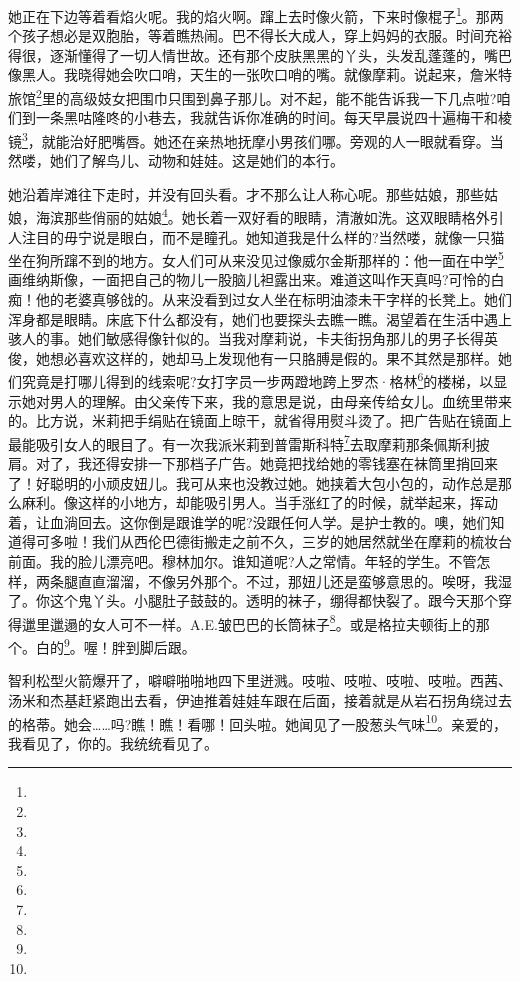 \par 她正在下边等着看焰火呢。我的焰火啊。蹿上去时像火箭，下来时像棍子\footnote{}。那两个孩子想必是双胞胎，等着瞧热闹。巴不得长大成人，穿上妈妈的衣服。时间充裕得很，逐渐懂得了一切人情世故。还有那个皮肤黑黑的丫头，头发乱蓬蓬的，嘴巴像黑人。我晓得她会吹口哨，天生的一张吹口哨的嘴。就像摩莉。说起来，詹米特旅馆\footnote{}里的高级妓女把围巾只围到鼻子那儿。对不起，能不能告诉我一下几点啦?咱们到一条黑咕隆咚的小巷去，我就告诉你准确的时间。每天早晨说四十遍梅干和棱镜\footnote{}，就能治好肥嘴唇。她还在亲热地抚摩小男孩们哪。旁观的人一眼就看穿。当然喽，她们了解鸟儿、动物和娃娃。这是她们的本行。
\par 她沿着岸滩往下走时，并没有回头看。才不那么让人称心呢。那些姑娘，那些姑娘，海滨那些俏丽的姑娘\footnote{}。她长着一双好看的眼睛，清澈如洗。这双眼睛格外引人注目的毋宁说是眼白，而不是瞳孔。她知道我是什么样的?当然喽，就像一只猫坐在狗所蹿不到的地方。女人们可从来没见过像威尔金斯那样的：他一面在中学\footnote{}画维纳斯像，一面把自己的物儿一股脑儿袒露出来。难道这叫作天真吗?可怜的白痴！他的老婆真够戗的。从来没看到过女人坐在标明油漆未干字样的长凳上。她们浑身都是眼睛。床底下什么都没有，她们也要探头去瞧一瞧。渴望着在生活中遇上骇人的事。她们敏感得像针似的。当我对摩莉说，卡夫街拐角那儿的男子长得英俊，她想必喜欢这样的，她却马上发现他有一只胳膊是假的。果不其然是那样。她们究竟是打哪儿得到的线索呢?女打字员一步两蹬地跨上罗杰·格林\footnote{}的楼梯，以显示她对男人的理解。由父亲传下来，我的意思是说，由母亲传给女儿。血统里带来的。比方说，米莉把手绢贴在镜面上晾干，就省得用熨斗烫了。把广告贴在镜面上最能吸引女人的眼目了。有一次我派米莉到普雷斯科特\footnote{}去取摩莉那条佩斯利披肩。对了，我还得安排一下那档子广告。她竟把找给她的零钱塞在袜筒里捎回来了！好聪明的小顽皮妞儿。我可从来也没教过她。她挟着大包小包的，动作总是那么麻利。像这样的小地方，却能吸引男人。当手涨红了的时候，就举起来，挥动着，让血淌回去。这你倒是跟谁学的呢?没跟任何人学。是护士教的。噢，她们知道得可多啦！我们从西伦巴德街搬走之前不久，三岁的她居然就坐在摩莉的梳妆台前面。我的脸儿漂亮吧。穆林加尔。谁知道呢?人之常情。年轻的学生。不管怎样，两条腿直直溜溜，不像另外那个。不过，那妞儿还是蛮够意思的。唉呀，我湿了。你这个鬼丫头。小腿肚子鼓鼓的。透明的袜子，绷得都快裂了。跟今天那个穿得邋里邋遢的女人可不一样。A.E.皱巴巴的长筒袜子\footnote{}。或是格拉夫顿街上的那个。白的\footnote{}。喔！胖到脚后跟。
\par 智利松型火箭爆开了，噼噼啪啪地四下里迸溅。吱啦、吱啦、吱啦、吱啦。西茜、汤米和杰基赶紧跑出去看，伊迪推着娃娃车跟在后面，接着就是从岩石拐角绕过去的格蒂。她会……吗?瞧！瞧！看哪！回头啦。她闻见了一股葱头气味\footnote{}。亲爱的，我看见了，你的。我统统看见了。
